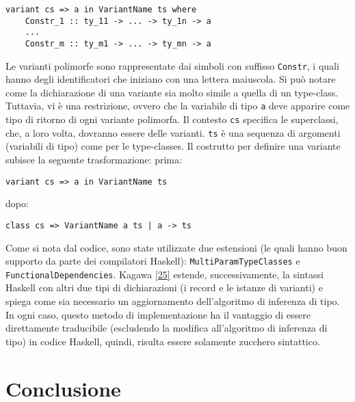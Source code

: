 \documentclass[10pt,a4paper]{article}
\begin{document}
\begin{itemize}
\begin{lstlisting}
variant cs => a in VariantName ts where
    Constr_1 :: ty_11 -> ... -> ty_1n -> a
    ...
    Constr_m :: ty_m1 -> ... -> ty_mn -> a
\end{lstlisting}
    Le varianti polimorfe sono rappresentate dai simboli con suffisso \texttt{Constr}, i quali hanno degli identificatori
    che iniziano con una lettera maiuscola. Si può notare come la dichiarazione di una variante sia molto simile a quella
    di un type-class. Tuttavia, vi è una restrizione, ovvero che la variabile di tipo \texttt{a} deve apparire come tipo
    di ritorno di ogni variante polimorfa. Il contesto \texttt{cs} specifica le superclassi, che, a loro volta, dovranno
    essere delle varianti. \texttt{ts} è una sequenza di argomenti (variabili di tipo) come per le type-classes.
    Il costrutto per definire una variante subisce la seguente trasformazione:
    \newline
    prima:
\begin{lstlisting}
variant cs => a in VariantName ts
\end{lstlisting}
    dopo:
\begin{lstlisting}
class cs => VariantName a ts | a -> ts
\end{lstlisting}
    Come si nota dal codice, sono state utilizzate due estensioni (le quali hanno buon supporto da parte dei compilatori
    Haskell): \texttt{MultiParamTypeClasses} e \texttt{FunctionalDependencies}.
    Kagawa \hyperlink{bibl25}{[25]} estende, successivamente, la sintassi Haskell con altri due tipi di
    dichiarazioni (i record e le istanze di varianti) e spiega come sia necessario un aggiornamento dell'algoritmo di
    inferenza di tipo. In ogni caso, questo metodo di implementazione ha il vantaggio di essere direttamente traducibile
    (escludendo la modifica all'algoritmo di inferenza di tipo) in codice Haskell, quindi, risulta essere solamente
    zucchero sintattico.
\end{itemize}

\section{Conclusione}
\end{document}
